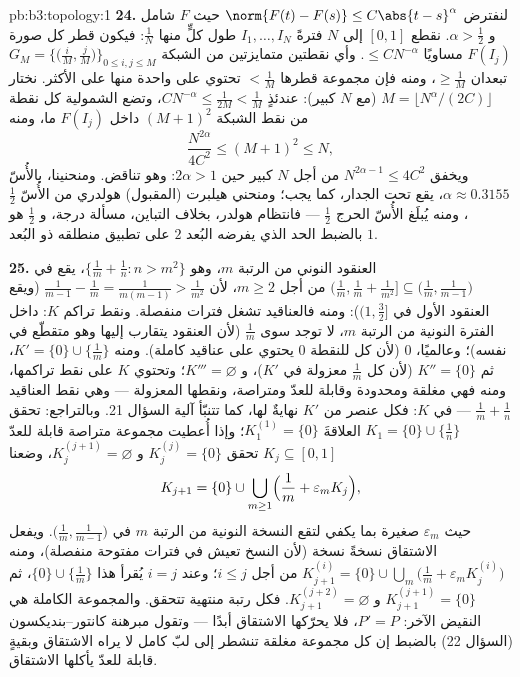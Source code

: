 \begin{solution}{pb:b3:topology:1}
\textbf{24.} لنفترض $\norm{F(t) - F(s)} \leq
C\abs{t-s}^\alpha$ حيث $F$ شامل و $\alpha >
\frac12$. نقطع
$[0,1]$ إلى $N$ فترةً $I_1, \dots, I_N$ طول كلٍّ منها $\frac1N$: فيكون
قطر كل صورة $F(I_j)$ مساويًا $\leq
CN^{-\alpha}$. وأي نقطتين متمايزتين من
الشبكة $G_M =
\bigl\{\bigl(\frac iM, \frac jM\bigr)\bigr\}_{0 \leq i, j
\leq M}$ تبعدان $\geq \frac1M$، ومنه فإن مجموعة قطرها
$< \frac1M$ تحتوي على واحدة منها على الأكثر. نختار $M =
\lfloor N^\alpha/(2C)\rfloor$
(مع $N$ كبير): عندئذٍ $CN^{-\alpha} \leq \frac1{2M} < \frac1M$، وتضع الشمولية كل نقطة من نقط
الشبكة $(M+1)^2$ داخل $F(I_j)$ ما، ومنه
\[
\frac{N^{2\alpha}}{4C^2} \leq (M + 1)^2 \leq N,
\]
ويخفق $N^{2\alpha - 1} \leq 4C^2$ من أجل $N$ كبير حين $2\alpha > 1$: وهو تناقض.
ومنحنينا، بالأُسّ $\alpha \approx
0.3155$، يقع تحت الجدار، كما يجب؛ ومنحني
هيلبرت (المقبول) هولدري من الأُسّ $\frac12$، ومنه يُبلَغ الأُسّ
الحرج $\frac12$ --- فانتظام هولدر، بخلاف التباين، مسألة درجة،
و $\frac12$ هو بالضبط الحد الذي يفرضه البُعد $2$ على تطبيق
منطلقه ذو البُعد $1$.

\textbf{25.} العنقود النوني من الرتبة $m$، وهو $\{\frac1m + \frac1n : n >
m^2\}$، يقع في
$\bigl(\frac1m, \frac1m + \frac1{m^2}\bigr]
\subseteq \bigl(\frac1m, \frac1{m-1}\bigr)$ من أجل $m \geq 2$، لأن $\frac1{m-1} - \frac1m = \frac1{m(m-1)} >
\frac1{m^2}$ (ويقع العنقود الأول في
$(1, \frac32]$): ومنه فالعناقيد تشغل فترات منفصلة. ونقط تراكم
$K$: داخل الفترة النونية من الرتبة $m$، لا توجد سوى $\frac1m$
(لأن العنقود يتقارب إليها وهو متقطّع في نفسه)؛ وعالميًا، $0$
(لأن كل  للنقطة $0$ يحتوي على عناقيد كاملة). ومنه $K'
= \{0\} \cup \{\frac1m\}$،
ثم $K'' = \{0\}$ (لأن كل $\frac1m$ معزولة في $K'$)، و $K''' = \varnothing$؛
وتحتوي $K$ على نقط تراكمها، ومنه فهي مغلقة ومحدودة وقابلة للعدّ
ومتراصة، ونقطها المعزولة --- وهي نقط العناقيد $\frac1m +
\frac1n$ --- 
في $K$: فكل عنصر من $K'$ نهايةٌ لها، كما تتنبّأ آلية السؤال 21.
وبالتراجع: تحقق $K_1 = \{0\}\cup\{\frac1n\}$ العلاقةَ $K_1^{(1)} = \{0\}$؛ وإذا أُعطيت مجموعة
متراصة قابلة للعدّ $K_j \subseteq [0, 1]$ تحقق $K_j^{(j)} =
\{0\}$ و $K_j^{(j+1)} = \varnothing$، وضعنا
\[
K_{j+1} = \{0\} \cup \bigcup_{m \geq 1}
\Bigl(\frac1m + \varepsilon_m K_j\Bigr),
\]
حيث $\varepsilon_m$ صغيرة بما يكفي لتقع النسخة النونية من
الرتبة $m$ في $\bigl(\frac1m, \frac1{m-1}\bigr)$. ويفعل الاشتقاق نسخةً نسخة (لأن النسخ
تعيش في فترات مفتوحة منفصلة)، ومنه $K_{j+1}^{(i)} = \{0\} \cup \bigcup_m\bigl(\frac1m +
\varepsilon_mK_j^{(i)}\bigr)$ من أجل $i \leq j$؛
وعند $i = j$ يُقرأ هذا $\{0\} \cup \{\frac1m\}$، ثم $K_{j+1}^{(j+1)} =
\{0\}$ و $K_{j+1}^{(j+2)} = \varnothing$. فكل رتبة
منتهية تتحقق. والمجموعة الكاملة هي النقيض الآخر: $P' = P$، فلا
يحرّكها الاشتقاق أبدًا --- وتقول مبرهنة كانتور--بنديكسون
(السؤال 22) بالضبط إن كل مجموعة مغلقة تنشطر إلى لبّ كامل لا
يراه الاشتقاق وبقيةٍ قابلة للعدّ يأكلها الاشتقاق.
\end{solution}
